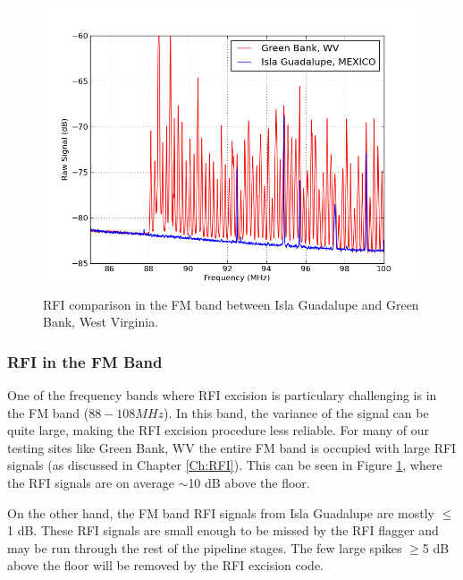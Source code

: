 \begin{figure}[htb]
\begin{center}
\includegraphics[width=0.9\linewidth]{Data_analysis/figures/FM_band_comp.png}
\caption{RFI comparison in the FM band between Isla Guadalupe and Green Bank, West Virginia. }
\label{Fig:FM_band}
\end{center}
\end{figure}

\subsubsection{RFI in the FM Band}

One of the frequency bands where RFI excision is particulary challenging is in the FM band ($88-108 MHz$). In this band, the variance of the signal can be quite large, making the RFI excision procedure less reliable. For many of our testing sites like Green Bank, WV the entire FM band is occupied with large RFI signals (as discussed in Chapter \ref{Ch:RFI}). This can be seen in Figure \ref{Fig:FM_band}, where the RFI signals are on average $\sim$10 dB above the floor. 

On the other hand, the FM band RFI signals from Isla Guadalupe are mostly $\leq$1 dB. These RFI signals are small enough to be missed by the RFI flagger and may be run through the rest of the pipeline stages. The few large spikes $\geq$5 dB above the floor will be removed by the RFI excision code. 

